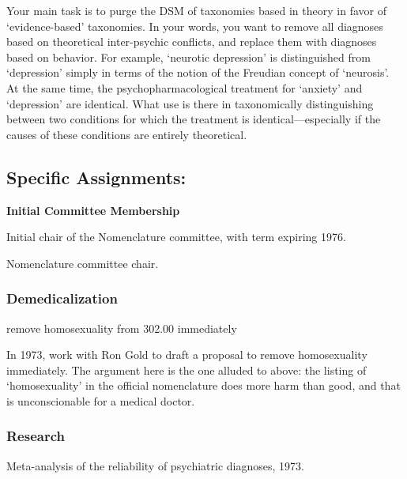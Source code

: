 \begin{refsection}
Your main task is to purge the DSM of taxonomies based in theory in favor of `evidence-based' taxonomies. In your words, you want to remove all diagnoses based on theoretical inter-psychic conflicts, and replace them with diagnoses based on behavior. For example, `neurotic depression' is distinguished from `depression' simply in terms of the notion of the Freudian concept of `neurosis'. At the same time, the psychopharmacological treatment for `anxiety' and `depression' are identical. What use is there in taxonomically distinguishing between two conditions for which the treatment is identical—especially if the causes of these conditions are entirely theoretical.

\subsection{Specific Assignments:}
\label{specificassignments:}

\textbf{Initial Committee Membership}
\begin{service}[Spitzer]\label{service:spltzer}
Initial chair of the Nomenclature committee, with term expiring 1976.
\end{service}
Nomenclature committee chair.

\subsubsection{Demedicalization}
\label{demedicalization}

\begin{proposal}[Spitzer]\label{proposal:spitzerB} remove homosexuality from 302.00 immediately\end{proposal}

In 1973, work with Ron Gold to draft a proposal to remove homosexuality immediately. The argument here is the one alluded to above: the listing of `homosexuality' in the official nomenclature does more harm than good, and that is unconscionable for a medical doctor.

\subsubsection{Research}
\label{research}

\begin{researchtask}[Spitzer]\label{researchtask:spitzer} Meta-analysis of the reliability of psychiatric diagnoses, 1973.\end{researchtask}


\end{refsection}
